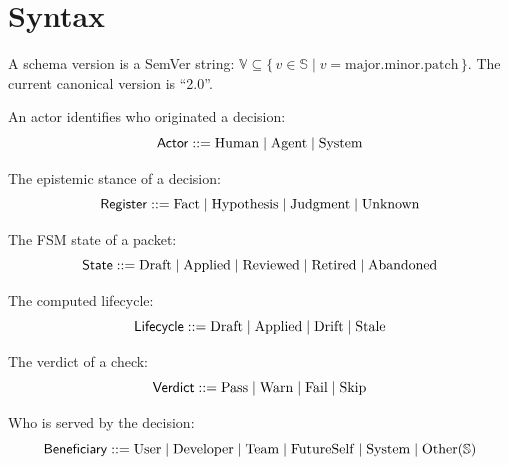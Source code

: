 
\section{Syntax}

\begin{definition}
A schema version is a SemVer string:
$\mathbb{V} \subseteq \{\, v \in \mathbb{S} \mid v = \mathrm{major}.\mathrm{minor}.\mathrm{patch} \,\}$.
The current canonical version is ``2.0''.
\end{definition}

\begin{definition}[Actor]
An actor identifies who originated a decision:
$$\mathsf{Actor} ::= \mathrm{Human} \mid \mathrm{Agent} \mid \mathrm{System}$$
\end{definition}

\begin{definition}[Register]
The epistemic stance of a decision:
$$\mathsf{Register} ::= \mathrm{Fact} \mid \mathrm{Hypothesis} \mid \mathrm{Judgment} \mid \mathrm{Unknown}$$
\end{definition}

\begin{definition}[State]
The FSM state of a packet:
$$\mathsf{State} ::= \mathrm{Draft} \mid \mathrm{Applied} \mid \mathrm{Reviewed} \mid \mathrm{Retired} \mid \mathrm{Abandoned}$$
\end{definition}

\begin{definition}[Lifecycle]
The computed lifecycle:
$$\mathsf{Lifecycle} ::= \mathrm{Draft} \mid \mathrm{Applied} \mid \mathrm{Drift} \mid \mathrm{Stale}$$
\end{definition}

\begin{definition}[Verdict]
The verdict of a check:
$$\mathsf{Verdict} ::= \mathrm{Pass} \mid \mathrm{Warn} \mid \mathrm{Fail} \mid \mathrm{Skip}$$
\end{definition}

\begin{definition}[Beneficiary]
Who is served by the decision:
$$\mathsf{Beneficiary} ::= \mathrm{User} \mid \mathrm{Developer} \mid \mathrm{Team} \mid \mathrm{FutureSelf} \mid \mathrm{System} \mid \mathrm{Other}(\mathbb{S})$$
\end{definition}

